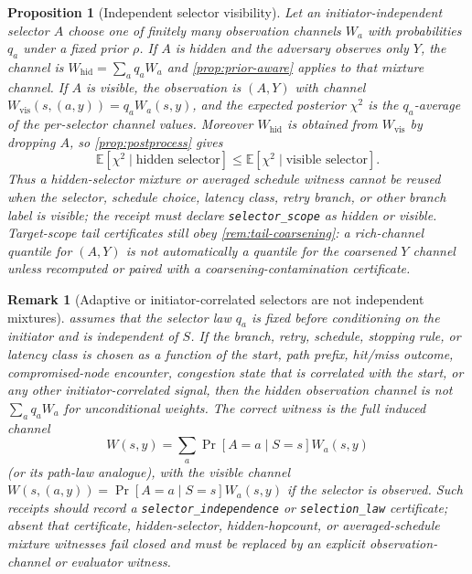 \documentclass[11pt]{article}
\newtheorem{proposition}[theorem]{Proposition}
\newtheorem{remark}[theorem]{Remark}
\newcommand{\E}{\mathbb{E}}
\begin{document}
\begin{proposition}[Independent selector visibility]\label{prop:selector-visible}
Let an initiator-independent selector $A$ choose one of finitely many observation
channels $W_a$ with probabilities $q_a$ under a fixed prior $\rho$.  If $A$ is
hidden and the adversary observes only $Y$, the channel is
$W_{\mathrm{hid}}=\sum_a q_a W_a$ and \cref{prop:prior-aware} applies to that
mixture channel.  If $A$ is visible, the observation is $(A,Y)$ with channel
$W_{\mathrm{vis}}(s,(a,y))=q_a W_a(s,y)$, and the expected posterior $\chi^2$ is
the $q_a$-average of the per-selector channel values.  Moreover
$W_{\mathrm{hid}}$ is obtained from $W_{\mathrm{vis}}$ by dropping $A$, so
\cref{prop:postprocess} gives
\[
  \E[\chi^2\mid \text{hidden selector}]
  \le
  \E[\chi^2\mid \text{visible selector}].
\]
Thus a hidden-selector mixture or averaged schedule witness cannot be reused when
the selector, schedule choice, latency class, retry branch, or other branch label
is visible; the receipt must declare \texttt{selector\_scope} as hidden or visible.
Target-scope tail certificates still obey \cref{rem:tail-coarsening}: a
rich-channel quantile for $(A,Y)$ is not automatically a quantile for the
coarsened $Y$ channel unless recomputed or paired with a coarsening-contamination
certificate.
\end{proposition}

\begin{remark}[Adaptive or initiator-correlated selectors are not independent mixtures]\label{rem:adaptive-selector}
 assumes that the selector law $q_a$ is fixed before
conditioning on the initiator and is independent of $S$.  If the branch, retry,
schedule, stopping rule, or latency class is chosen as a function of the start,
path prefix, hit/miss outcome, compromised-node encounter, congestion state that
is correlated with the start, or any other initiator-correlated signal, then the
hidden observation channel is not $\sum_a q_aW_a$ for unconditional weights.  The
correct witness is the full induced channel
\[
  W(s,y)=\sum_a \Pr[A=a\mid S=s] W_a(s,y)
\]
(or its path-law analogue), with the visible channel $W(s,(a,y))=\Pr[A=a\mid
S=s]W_a(s,y)$ if the selector is observed.  Such receipts should record a
\texttt{selector\_independence} or \texttt{selection\_law} certificate; absent
that certificate, hidden-selector, hidden-hopcount, or averaged-schedule mixture
witnesses fail closed and must be replaced by an explicit observation-channel or
evaluator witness.
\end{remark}
\end{document}
